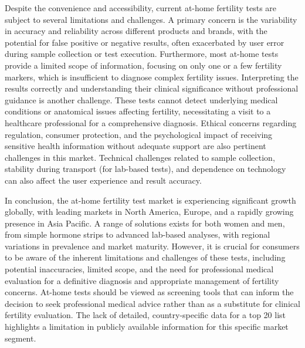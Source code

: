 \documentclass{article}
\begin{document}
Despite the convenience and accessibility, current at-home fertility tests are subject to several limitations and challenges. A primary concern is the variability in accuracy and reliability across different products and brands, with the potential for false positive or negative results, often exacerbated by user error during sample collection or test execution. Furthermore, most at-home tests provide a limited scope of information, focusing on only one or a few fertility markers, which is insufficient to diagnose complex fertility issues. Interpreting the results correctly and understanding their clinical significance without professional guidance is another challenge. These tests cannot detect underlying medical conditions or anatomical issues affecting fertility, necessitating a visit to a healthcare professional for a comprehensive diagnosis. Ethical concerns regarding regulation, consumer protection, and the psychological impact of receiving sensitive health information without adequate support are also pertinent challenges in this market. Technical challenges related to sample collection, stability during transport (for lab-based tests), and dependence on technology can also affect the user experience and result accuracy.

In conclusion, the at-home fertility test market is experiencing significant growth globally, with leading markets in North America, Europe, and a rapidly growing presence in Asia Pacific. A range of solutions exists for both women and men, from simple hormone strips to advanced lab-based analyses, with regional variations in prevalence and market maturity. However, it is crucial for consumers to be aware of the inherent limitations and challenges of these tests, including potential inaccuracies, limited scope, and the need for professional medical evaluation for a definitive diagnosis and appropriate management of fertility concerns. At-home tests should be viewed as screening tools that can inform the decision to seek professional medical advice rather than as a substitute for clinical fertility evaluation. The lack of detailed, country-specific data for a top 20 list highlights a limitation in publicly available information for this specific market segment.
\end{document}
